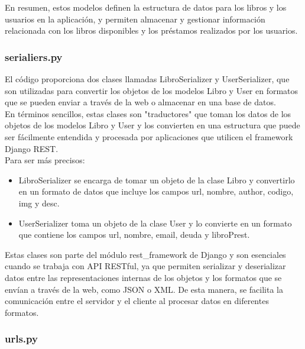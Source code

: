 \documentclass{article}
\begin{document}
	
	
	En resumen, estos modelos definen la estructura de datos para los libros y los usuarios en la aplicación, y permiten almacenar y gestionar información relacionada con los libros disponibles y los préstamos realizados por los usuarios.
	
	
	\subsubsection{serialiers.py}
	
	El código proporciona dos clases llamadas LibroSerializer y UserSerializer, que son utilizadas para convertir los objetos de los modelos Libro y User en formatos que se pueden enviar a través de la web o almacenar en una base de datos.\\
	
	En términos sencillos, estas clases son "traductores" que toman los datos de los objetos de los modelos Libro y User y los convierten en una estructura que puede ser fácilmente entendida y procesada por aplicaciones que utilicen el framework Django REST.\\
	
	Para ser más precisos:
	
	\begin{itemize}
		\item LibroSerializer se encarga de tomar un objeto de la clase Libro y convertirlo en un formato de datos que incluye los campos url, nombre, author, codigo, img y desc.
		\item  UserSerializer toma un objeto de la clase User y lo convierte en un formato que contiene los campos url, nombre, email, deuda y libroPrest.
	\end{itemize}
	
	Estas clases son parte del módulo rest\_framework de Django y son esenciales cuando se trabaja con API RESTful, ya que permiten serializar y deserializar datos entre las representaciones internas de los objetos y los formatos que se envían a través de la web, como JSON o XML. De esta manera, se facilita la comunicación entre el servidor y el cliente al procesar datos en diferentes formatos.\\
	
	
	
	\subsubsection{urls.py}
	
\end{document}
